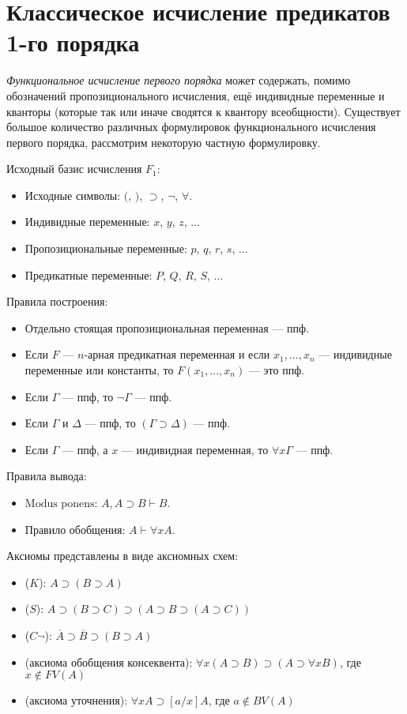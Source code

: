 \section{Классическое исчисление предикатов 1-го порядка}


{\it Функциональное исчисление первого порядка} может содержать, помимо обозначений пропозиционального исчисления, ещё индивидные переменные и кванторы (которые так или иначе сводятся к квантору всеобщности). Существует большое количество различных формулировок функционального исчисления первого порядка, рассмотрим некоторую частную формулировку.

Исходный базис исчисления $F_1$:
\begin{itemize}
    \item Исходные символы: $($, $)$, $\supset$, $\lnot$, $\forall$.
    \item Индивидные переменные: $x$, $y$, $z$, $\dots$
    \item Пропозициональные переменные: $p$, $q$, $r$, $s$, $\dots$
    \item Предикатные переменные: $P$, $Q$, $R$, $S$, $\dots$
\end{itemize}

Правила построения:
\begin{itemize}
    \item Отдельно стоящая пропозициональная переменная --- ппф.
    \item Если $F$ --- $n$-арная предикатная переменная и если $x_1,...,x_n$ --- индивидные переменные или константы, то $F(x_1,...,x_n)$ --- это ппф.
    \item Если $\Gamma$ --- ппф, то $\lnot \Gamma$ --- ппф.
    \item Если $\Gamma$ и $\Delta$ --- ппф, то $(\Gamma \supset \Delta)$ --- ппф.
    \item Если $\Gamma$ --- ппф, а $x$ --- индивидная переменная, то $\forall x \Gamma$ --- ппф.
\end{itemize}

Правила вывода:
\begin{itemize}
    \item $\text{Modus ponens}$: $A, A \supset B \vdash B$.
    \item Правило обобщения: $A \vdash \forall x A$.
\end{itemize}

Аксиомы представлены в виде аксиомных схем: 
\begin{itemize}
    \item ($K$): $A \supset (B \supset A)$
    \item ($S$): $A \supset (B \supset C) \supset (A \supset B \supset (A \supset C))$
    \item ($C\lnot$): $\overline{A}\supset \overline{B} \supset (B \supset A)$
    \item (аксиома обобщения консеквента): $\forall x (A \supset B) \supset (A \supset \forall x B)$, где $x\notin FV(A)$
    \item (аксиома уточнения): $\forall x A \supset [a/x]A$, где $a \notin BV(A)$
\end{itemize}


